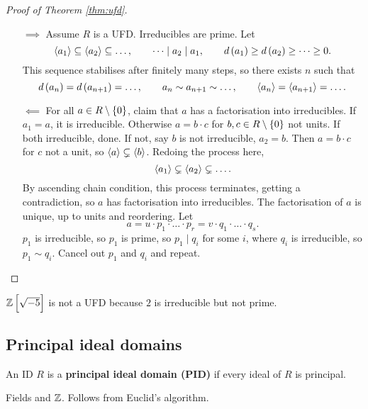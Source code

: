 \begin{proof}[Proof of Theorem \ref{thm:ufd}]
\hfill
\begin{itemize}
\item[$ \implies $] Assume $ R $ is a UFD. Irreducibles are prime. Let
$$ \abr{a_1} \subseteq \abr{a_2} \subseteq \dots, \qquad \dots \mid a_2 \mid a_1, \qquad d\br{a_1} \ge d\br{a_2} \ge \dots \ge 0. $$
This sequence stabilises after finitely many steps, so there exists $ n $ such that
$$ d\br{a_n} = d\br{a_{n + 1}} = \dots, \qquad a_n \sim a_{n + 1} \sim \dots, \qquad \abr{a_n} = \abr{a_{n + 1}} = \dots. $$

\pagebreak

\item[$ \impliedby $] For all $ a \in R \setminus \cbr{0} $, claim that $ a $ has a factorisation into irreducibles. If $ a_1 = a $, it is irreducible. Otherwise $ a = b \cdot c $ for $ b, c \in R \setminus \cbr{0} $ not units. If both irreducible, done. If not, say $ b $ is not irreducible, $ a_2 = b $. Then $ a = b \cdot c $ for $ c $ not a unit, so $ \left\langle a \right\rangle \subsetneq \left\langle b \right\rangle $. Redoing the process here,
$$ \left\langle a_1 \right\rangle \subsetneq \left\langle a_2 \right\rangle \subsetneq \dots. $$
By ascending chain condition, this process terminates, getting a contradiction, so $ a $ has factorisation into irreducibles. The factorisation of $ a $ is unique, up to units and reordering. Let
$$ a = u \cdot p_1 \cdot \dots \cdot p_r = v \cdot q_1 \cdot \dots \cdot q_s. $$
$ p_1 $ is irreducible, so $ p_1 $ is prime, so $ p_1 \mid q_i $ for some $ i $, where $ q_i $ is irreducible, so $ p_1 \sim q_i $. Cancel out $ p_1 $ and $ q_i $ and repeat.
\end{itemize}
\end{proof}

\begin{remark*}
$ \Z\sbr{\sqrt{-5}} $ is not a UFD because $ 2 $ is irreducible but not prime.
\end{remark*}

\subsection{Principal ideal domains}

\begin{definition}
An ID $ R $ is a \textbf{principal ideal domain (PID)} if every ideal of $ R $ is principal.
\end{definition}

\begin{example*}
Fields and $ \mathbb{Z} $. Follows from Euclid's algorithm.
\end{example*}

